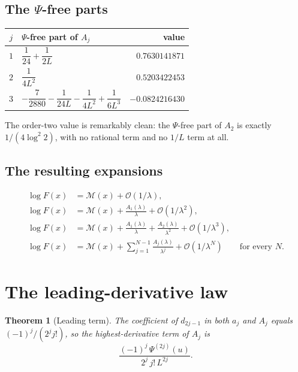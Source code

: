 \documentclass[11pt,oneside]{article}
\newtheorem{theorem}{Theorem}[section]
\theoremstyle{definition}
\theoremstyle{remark}
\newcommand{\bigO}{\mathcal O}
\begin{document}
\subsection{The \texorpdfstring{$\Psi$}{Psi}-free parts}

\begin{center}
\begin{tabular}{@{}clr@{}}
\toprule
$j$ & $\Psi$-free part of $A_j$ & value\\
\midrule
$1$ & $\dfrac1{24}+\dfrac1{2L}$ & $0.7630141871$\\[0.6em]
$2$ & $\dfrac1{4L^2}$ & $0.5203422453$\\[0.6em]
$3$ & $-\dfrac7{2880}-\dfrac1{24L}-\dfrac1{4L^2}+\dfrac1{6L^3}$ & $-0.0824216430$\\
\bottomrule
\end{tabular}
\end{center}

The order-two value is remarkably clean: the $\Psi$-free part of $A_2$ is
exactly $1/(4\log^2 2)$, with no rational term and no $1/L$ term at all.

\subsection{The resulting expansions}

\[
\begin{aligned}
  \log F(x)&=\mathcal M(x)+\bigO(1/\lambda),\\
  \log F(x)&=\mathcal M(x)+\frac{A_1(\lambda)}{\lambda}+\bigO(1/\lambda^2),\\
  \log F(x)&=\mathcal M(x)+\frac{A_1(\lambda)}{\lambda}
    +\frac{A_2(\lambda)}{\lambda^2}+\bigO(1/\lambda^3),\\
  \log F(x)&=\mathcal M(x)+\sum_{j=1}^{N-1}\frac{A_j(\lambda)}{\lambda^j}
    +\bigO(1/\lambda^N)\qquad\text{for every }N.
\end{aligned}
\]

\section{The leading-derivative law}\label{sec:leading}

\begin{theorem}[Leading term]\label{thm:leading}
The coefficient of $d_{2j-1}$ in both $a_j$ and $A_j$ equals
$(-1)^j/(2^jj!)$, so the highest-derivative term of $A_j$ is
\[
  \frac{(-1)^j\,\Psi^{(2j)}(u)}{2^j\,j!\,L^{2j}}.
\]
\end{theorem}
\end{document}
